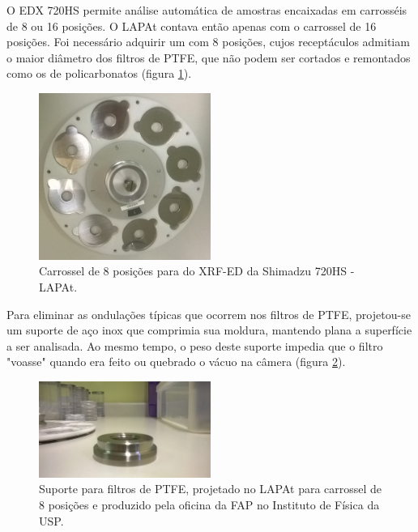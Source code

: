 O EDX 720HS permite análise automática de amostras encaixadas em carrosséis 
de 8 ou 16 posições. O LAPAt contava então apenas com o carrossel de 16 
posições. Foi necessário adquirir um com 8 posições, cujos receptáculos admitiam
o maior diâmetro dos filtros de PTFE, que não podem ser cortados e remontados 
como os de policarbonatos (figura \ref{fig:carrossel8}).

\begin{figure}[H]
  \centering
  \includegraphics[width=0.5\textwidth]{../inputs/images/carrossel8.jpg}
  \caption{Carrossel de 8 posições para do XRF-ED da Shimadzu 720HS
           - LAPAt. \label{fig:carrossel8}}
\end{figure}

Para eliminar as ondulações típicas que ocorrem nos filtros de PTFE, 
projetou-se um suporte de aço inox que comprimia sua moldura, mantendo plana 
a superfície a ser analisada. Ao mesmo tempo, o peso deste suporte impedia que 
o filtro "voasse" quando era feito ou quebrado o vácuo na câmera 
(figura \ref{fig:suporte8}).

\begin{figure}[H]
  \centering
  \includegraphics[width=0.5\textwidth]{../inputs/images/suporte8.jpg}
  \caption{Suporte para filtros de PTFE, projetado no LAPAt para carrossel de 
           8 posições e produzido pela oficina da FAP no 
           Instituto de Física da USP. \label{fig:suporte8}}
\end{figure}


